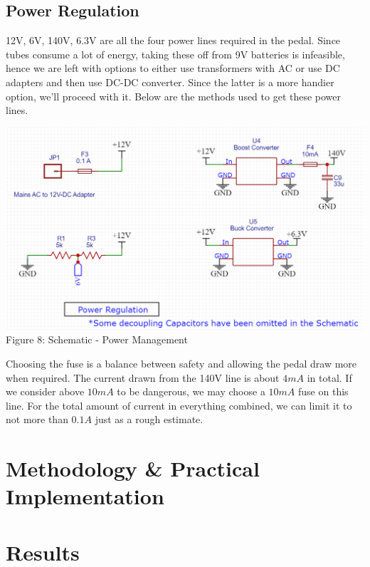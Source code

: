 \documentclass[11pt]{article}
\newcommand{\tab}{\hspace*{6mm}}
\begin{document}
\subsection{Power Regulation}
\tab 12V, 6V, 140V, 6.3V are all the four power lines required in the pedal. Since tubes consume a lot of energy, taking these off from 9V batteries is infeasible, hence we are left with options to either use transformers with AC or use DC adapters and then use DC-DC converter. Since the latter is a more handier option, we'll proceed with it. Below are the methods used to get these power lines. 
\begin{center}\includegraphics[width=\textwidth]{Documentation LaTeX/sch_power.png}\\\small{Figure 8: Schematic - Power Management}\end{center}
\tab Choosing the fuse is a balance between safety and allowing the pedal draw more when required. The current drawn from the 140V line is about $4 mA$ in total. If we consider above $10 mA$ to be dangerous, we may choose a $10 mA$ fuse on this line. For the total amount of current in everything combined, we can limit it to not more than $0.1A$ just as a rough estimate.  
    \section{Methodology \& Practical Implementation}
    \section{Results}
\end{document}
